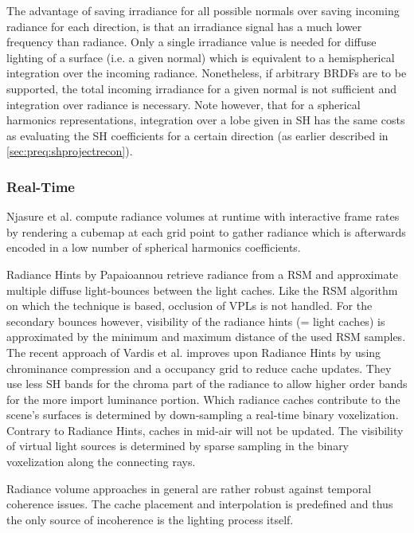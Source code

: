 \documentclass[thesis.tex]{subfiles}
\begin{document}
The advantage of saving irradiance for all possible normals over saving incoming radiance for each direction, is that an irradiance signal has a much lower frequency than radiance.
Only a single irradiance value is needed for diffuse lighting of a surface (i.e. a given normal) which is equivalent to a hemispherical integration over the incoming radiance.
Nonetheless, if arbitrary BRDFs are to be supported, the total incoming irradiance for a given normal is not sufficient and integration over radiance is necessary.
Note however, that for a spherical harmonics representations, integration over a lobe given in SH has the same costs as evaluating the SH coefficients for a certain direction (as earlier described in \autoref{sec:preq:shprojectrecon}).

\subsubsection{Real-Time}
Njasure et al. \cite{bib:nijasure:rtirradiancevol} compute radiance volumes at runtime with interactive frame rates by rendering a cubemap at each grid point to gather radiance which is afterwards encoded in a low number of spherical harmonics coefficients.

Radiance Hints by Papaioannou \cite{bib:radiancehints} retrieve radiance from a RSM and approximate multiple diffuse light-bounces between the light caches.
Like the RSM algorithm on which the technique is based, occlusion of VPLs is not handled.
For the secondary bounces however, visibility of the radiance hints (= light caches) is approximated by the minimum and maximum distance of the used RSM samples.
\\
The recent approach of Vardis et al. \cite{bib:radiancecachechromaticcompression} improves upon Radiance Hints by using chrominance compression and a occupancy grid to reduce cache updates.
They use less SH bands for the chroma part of the radiance to allow higher order bands for the more import luminance portion.
Which radiance caches contribute to the scene's surfaces is determined by down-sampling a real-time binary voxelization.
Contrary to Radiance Hints, caches in mid-air will not be updated.
The visibility of virtual light sources is determined by sparse sampling in the binary voxelization along the connecting rays.

Radiance volume approaches in general are rather robust against temporal coherence issues.
The cache placement and interpolation is predefined and thus the only source of incoherence is the lighting process itself.
\end{document}
